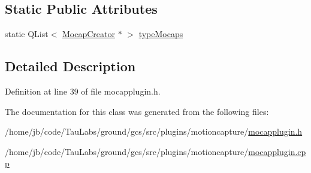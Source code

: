 \subsection*{\-Static \-Public \-Attributes}
\begin{DoxyCompactItemize}
\item 
static \-Q\-List$<$ \hyperlink{class_mocap_creator}{\-Mocap\-Creator} $\ast$ $>$ \hyperlink{group___mo_cap_plugin_gaca68fd324d804c3124d7ba64b5d0294a}{type\-Mocaps}
\end{DoxyCompactItemize}


\subsection{\-Detailed \-Description}


\-Definition at line 39 of file mocapplugin.\-h.



\-The documentation for this class was generated from the following files\-:\begin{DoxyCompactItemize}
\item 
/home/jb/code/\-Tau\-Labs/ground/gcs/src/plugins/motioncapture/\hyperlink{mocapplugin_8h}{mocapplugin.\-h}\item 
/home/jb/code/\-Tau\-Labs/ground/gcs/src/plugins/motioncapture/\hyperlink{mocapplugin_8cpp}{mocapplugin.\-cpp}\end{DoxyCompactItemize}
